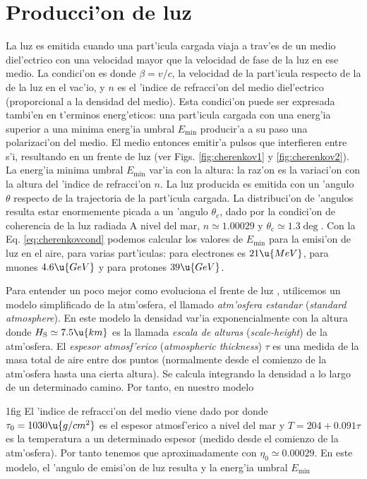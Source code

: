 \section{Producci'on de luz \Cerenkov}

La luz \Cerenkov es emitida cuando una part'icula cargada viaja a
trav'es de un medio diel'ectrico con una velocidad mayor que la
velocidad de fase de la luz en ese medio. La condici'on es
%
\Cherenkovcondeq
%
donde $\beta=v/c$, la velocidad de la part'icula respecto de la de la
luz en el vac'io, y $n$ es el 'indice de refracci'on del medio
diel'ectrico (proporcional a la densidad del medio). Esta condici'on
puede ser expresada tambi'en en t'erminos energ'eticos: una part'icula
cargada con una energ'ia superior a una minima energ'ia umbral
$E_{\mathrm{min}}$ producir'a a su paso una polarizaci'on del
medio. El medio entonces emitir'a pulsos que interfieren entre s'i,
resultando en un frente de luz (ver Figs. \ref{fig:cherenkov1} y
\ref{fig:cherenkov2}). La energ'ia minima umbral $E_{\mathrm{min}}$
var'ia con la altura: la raz'on es la variaci'on con la altura del
'indice de refracci'on $n$. La luz producida es emitida con un 'angulo
$\theta$ respecto de la trajectoria de la part'icula cargada. La
distribuci'on de 'angulos resulta estar enormemente picada a un
'angulo $\theta_{\mathrm{c}}$, dado por la condici'on de coherencia de
la luz radiada
%
\lightcoherenceeq%
A nivel del mar, $n \simeq 1.00029$ y $\theta_{\mathrm{c}} \simeq
1.3\deg$. Con la Eq. \ref{eq:cherenkovcond} podemos calcular los
valores de $E_{\mathrm{min}}$ para la emisi'on de luz \Cerenkov en el
aire, para varias part'iculas: para electrones es $21\u{MeV}$, para
muones $4.6\u{GeV}$ y para protones $39\u{GeV}$.

Para entender un poco mejor como evoluciona el frente de luz
\Cerenkov, utilicemos un modelo simplificado de la atm'osfera, el
llamado \emph{atm'osfera estandar} (\emph{standard atmosphere}). En
este modelo la densidad var'ia exponencialmente con la altura
%
\exprhoeq
%
donde $H_{\mathrm{S}} \simeq 7.5\u{km}$ es la llamada \emph{escala de
alturas} (\emph{scale-height}) de la atm'osfera. El \emph{espesor
atmosf'erico} (\emph{atmospheric thickness}) $\tau$ es una medida de
la masa total de aire entre dos puntos (normalmente desde el comienzo
de la atm'osfera hasta una cierta altura). Se calcula integrando la
densidad a lo largo de un determinado camino. Por tanto, en nuestro
modelo
%
\pathinteq

\cherenkov1fig
%
El 'indice de refracci'on del medio viene dado por 
%
%
donde $\tau_0=1030\u{g/cm^2}$ es el espesor atmosf'erico a nivel del
mar y $T=204 + 0.091\tau$ es la temperatura a un determinado espesor
(medido desde el comienzo de la atm'osfera). Por tanto tenemos que
aproximadamente
%
\etaeq
%
con $\eta_0 \simeq 0.00029$. En este modelo, el 'angulo de emisi'on de 
luz \Cerenkov resulta
%
\Cherenkovangleeq
%
y la energ'ia umbral $E_{\mathrm{min}}$
%
\Emineq

